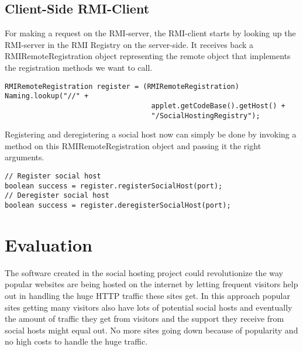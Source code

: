 \documentclass[a4paper, 10pt]{article}
\begin{document}
\subsection{Client-Side RMI-Client}
For making a request on the RMI-server, the RMI-client starts by looking up the RMI-server in the RMI Registry on the server-side. It receives back a RMIRemoteRegistration object representing the remote object that implements the registration methods we want to call.
\begin{lstlisting}
RMIRemoteRegistration register = (RMIRemoteRegistration) Naming.lookup("//" + 
                                   applet.getCodeBase().getHost() +
                                   "/SocialHostingRegistry");
\end{lstlisting}
Registering and deregistering a social host now can simply be done by invoking a method on this RMIRemoteRegistration object and passing it the right arguments.
\begin{lstlisting}
// Register social host
boolean success = register.registerSocialHost(port);
// Deregister social host
boolean success = register.deregisterSocialHost(port);
\end{lstlisting}

\section{Evaluation}
The software created in the social hosting project could revolutionize the way popular websites are being hosted on the internet by letting frequent visitors help out in handling the huge HTTP traffic these sites get. In this approach popular sites getting many visitors also have lots of potential social hosts and eventually the amount of traffic they get from visitors and the support they receive from social hosts might equal out. No more sites going down because of popularity and no high costs to handle the huge traffic.
\end{document}
